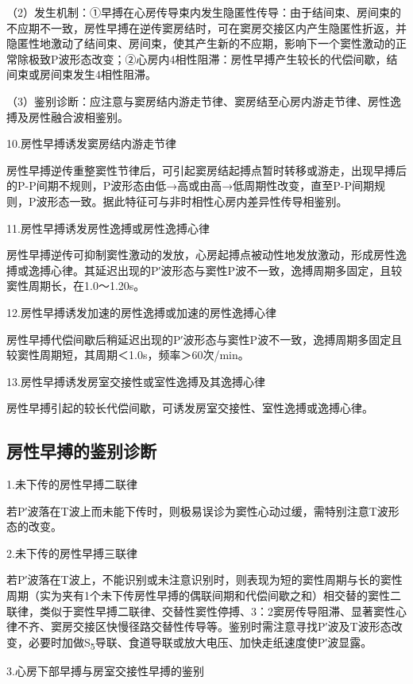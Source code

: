 （2）发生机制：①早搏在心房传导束内发生隐匿性传导：由于结间束、房间束的不应期不一致，房性早搏在逆传窦房结时，可在窦房交接区内产生隐匿性折返，并隐匿性地激动了结间束、房间束，使其产生新的不应期，影响下一个窦性激动的正常除极致P波形态改变；②心房内4相性阻滞：房性早搏产生较长的代偿间歇，结间束或房间束发生4相性阻滞。

（3）鉴别诊断：应注意与窦房结内游走节律、窦房结至心房内游走节律、房性逸搏及房性融合波相鉴别。

10.房性早搏诱发窦房结内游走节律

房性早搏逆传重整窦性节律后，可引起窦房结起搏点暂时转移或游走，出现早搏后的P-P间期不规则，P波形态由低→高或由高→低周期性改变，直至P-P间期规则，P波形态一致。据此特征可与非时相性心房内差异性传导相鉴别。

11.房性早搏诱发房性逸搏或房性逸搏心律

房性早搏逆传可抑制窦性激动的发放，心房起搏点被动性地发放激动，形成房性逸搏或逸搏心律。其延迟出现的P′波形态与窦性P波不一致，逸搏周期多固定，且较窦性周期长，在1.0～1.20s。

12.房性早搏诱发加速的房性逸搏或加速的房性逸搏心律

房性早搏代偿间歇后稍延迟出现的P′波形态与窦性P波不一致，逸搏周期多固定且较窦性周期短，其周期＜1.0s，频率＞60次/min。

13.房性早搏诱发房室交接性或室性逸搏及其逸搏心律

房性早搏引起的较长代偿间歇，可诱发房室交接性、室性逸搏或逸搏心律。

\protect\hypertarget{text00018.htmlux5cux23subid142}{}{}

\subsection{房性早搏的鉴别诊断}

1.未下传的房性早搏二联律

若P′波落在T波上而未能下传时，则极易误诊为窦性心动过缓，需特别注意T波形态的改变。

2.未下传的房性早搏三联律

若P′波落在T波上，不能识别或未注意识别时，则表现为短的窦性周期与长的窦性周期（实为夹有1个未下传房性早搏的偶联间期和代偿间歇之和）相交替的窦性二联律，类似于窦性早搏二联律、交替性窦性停搏、3：2窦房传导阻滞、显著窦性心律不齐、窦房交接区快慢径路交替性传导等。鉴别时需注意寻找P′波及T波形态改变，必要时加做S\textsubscript{5}导联、食道导联或放大电压、加快走纸速度使P′波显露。

3.心房下部早搏与房室交接性早搏的鉴别

